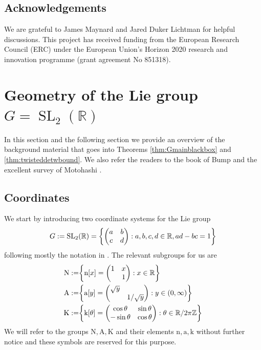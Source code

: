 \documentclass[12pt]{amsart}
\theoremstyle{definition}
\theoremstyle{remark}
\numberwithin{equation}{section}
\newcommand{\R}{{\mathbb R}}
\newcommand{\Z}{{\mathbb Z}}
\newcommand{\1}{{\mathbf 1}}
\newcommand{\SL}{\operatorname{SL}_2}
\renewcommand{\a}{\mathrm{a}}
\newcommand{\n}{\mathrm{n}}
\renewcommand{\k}{\mathrm{k}}
\renewcommand{\n}{\mathrm{n}}
\begin{document}
\subsection{Acknowledgements}
We are grateful to James Maynard and Jared Duker Lichtman for helpful discussions. This project has
received funding from the European Research Council (ERC) under the European Union's Horizon 2020 research and innovation programme (grant agreement No 851318).

\section{Geometry of the Lie group $G=\SL(\R)$} \label{sec:geomliegroup}
In this section and the following section  we provide an overview of the background material that goes into Theorems \ref{thm:Gmainblackbox} and \ref{thm:twisteddetwbound}. We also refer the readers to the book of Bump \cite{bump1997automorphic} and the excellent survey of Motohashi \cite{motohashielements}.
\subsection{Coordinates}
We start by introducing two coordinate systems for the Lie group 
\begin{align*}
 G:=  \SL(\R)  = \bigg\{ \mqty(a&b \\ c& d) : a,b,c,d \in \R, ad-bc=1  \bigg\} 
\end{align*}
following mostly the notation in \cite{motohashielements}. The relevant subgroups for us are
\begin{align*}
    \mathrm{N} :=& \bigg\{ \mathrm{n}[x] =  \mqty(1&x \\ & 1) : x \in \R  \bigg\}  \\
      \mathrm{A} := & \bigg\{ \mathrm{a}[y]= \mqty(\sqrt{y }& \\ & 1/\sqrt{y}) : y \in (0,\infty)  \bigg\} \\
        \mathrm{K} := &\bigg\{ \mathrm{k}[\theta] =  \mqty(\cos \theta & \sin \theta \\ -\sin \theta & \cos \theta) : \theta \in \R / 2\pi \Z \bigg\}  
\end{align*}
We will refer to the groups $ \mathrm{N}, \mathrm{A}, \mathrm{K}$ and their elements $\n,\a,\k$ without further notice and these symbols are reserved for this purpose.
\end{document}

